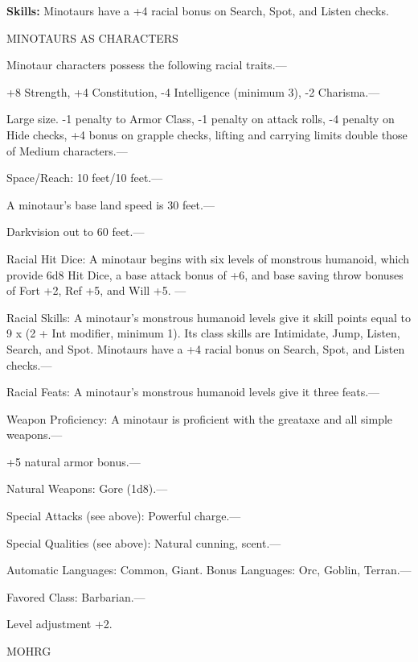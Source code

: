 \documentclass{article}
\begin{document}
\textbf{Skills:} Minotaurs have a +4 racial bonus on Search, Spot, and Listen checks.

MINOTAURS AS CHARACTERS

Minotaur characters possess the following racial traits.--- 

\parindent=3pt
+8 Strength, +4 Constitution, -4 Intelligence (minimum 3), -2 Charisma.---

\parindent=0pt
Large size. -1 penalty to Armor Class, -1 penalty on attack rolls, -4 penalty on 
Hide checks, +4 bonus on grapple checks, lifting and carrying limits double those 
of Medium characters.---

Space/Reach: 10 feet/10 feet.---

A minotaur's base land speed is 30 feet.---

Darkvision out to 60 feet.---

Racial Hit Dice: A minotaur begins with six levels of monstrous humanoid, which 
provide 6d8 Hit Dice, a base attack bonus of +6, and base saving throw bonuses 
of Fort +2, Ref +5, and Will +5. ---

Racial Skills: A minotaur's monstrous humanoid levels give it skill points equal 
to 9 x $ $(2 + Int modifier, minimum 1). Its class skills are Intimidate, Jump, 
Listen, Search, and Spot. Minotaurs have a +4 racial bonus on Search, Spot, and 
Listen checks.---

Racial Feats: A minotaur's monstrous humanoid levels give it three feats.---

Weapon Proficiency: A minotaur is proficient with the greataxe and all simple weapons.--- 

\parindent=3pt
+5 natural armor bonus.---

\parindent=0pt
Natural Weapons: Gore (1d8).---

Special Attacks (see above): Powerful charge.---

Special Qualities (see above): Natural cunning, scent.---

Automatic Languages: Common, Giant. Bonus Languages: Orc, Goblin, Terran.---

Favored Class: Barbarian.---

Level adjustment +2.

\vspace{12pt}
{\LARGE{}MOHRG}
\end{document}
